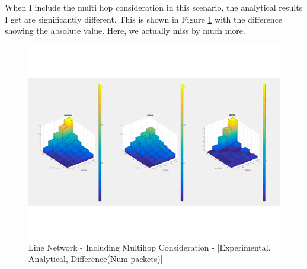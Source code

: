 \documentclass[conference]{IEEEtran}
\begin{document}
When I include the multi hop consideration in this scenario, the analytical results I get are significantly different.  This is shown in Figure \ref{fig:line_net_uni_mhop} with the difference showing the absolute value.  Here, we actually miss by much more.

\begin{figure}
    \includegraphics[scale=0.65]{result_expl_figs/line_unicast_IS_50_CR_2_mhop.pdf}
    \caption{Line Network - Including Multihop Consideration - [Experimental, Analytical, Difference(Num packets)]}
    \label{fig:line_net_uni_mhop}
\end{figure}
\end{document}

